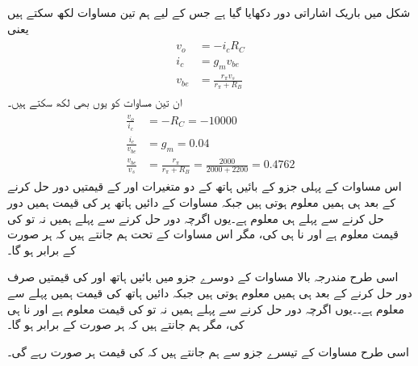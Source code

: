 شکل   میں باریک اشاراتی دور دکھایا گیا ہے جس کے لیے ہم تین مساوات لکھ سکتے ہیں یعنی
\begin{gather}
\begin{aligned}
v_o &=-i_c R_C\\
i_c &=g_m v_{be}\\
v_{be} &=\frac{r_{\pi} v_s}{r_{\pi}+R_B}
\end{aligned}
\end{gather}
ان تین مساوات کو یوں بھی لکھ سکتے ہیں۔
\begin{gather}  \label{مساوات_ٹرانزسٹر_شرح_کی_قیمتیں_الف}
\begin{aligned}
\frac{v_o}{i_c}&=-R_C = \num{-10000}\\
\frac{i_c}{v_{be}}&=g_m=\num{0.04}\\
\frac{v_{be}}{v_s}&=\frac{r_{\pi}}{r_{\pi}+R_B}=\frac{2000}{2000+2200}=\num{0.4762}
\end{aligned}
\end{gather}
اس مساوات کے پہلی جزو کے بائیں ہاتھ کے دو متغیرات  اور  کے قیمتیں دور حل کرنے کے بعد ہی ہمیں معلوم ہوتی ہیں جبکہ مساوات کے دائیں ہاتھ پر  کی قیمت  ہمیں دور حل کرنے سے پہلے ہی معلوم ہے۔یوں اگرچہ دور حل کرنے سے پہلے ہمیں نہ تو  کی قیمت معلوم ہے اور نا ہی  کی، مگر اس مساوات کے تحت ہم جانتے ہیں کہ  ہر صورت  کے برابر ہو گا۔


اسی طرح مندرجہ بالا مساوات کے دوسرے جزو میں بائیں ہاتھ  اور  کی قیمتیں صرف دور حل کرنے کے بعد ہی ہمیں معلوم ہوتی ہیں جبکہ دائیں ہاتھ  کی قیمت  ہمیں پہلے سے معلوم ہے۔۔یوں اگرچہ دور حل کرنے سے پہلے ہمیں نہ تو  کی قیمت معلوم ہے اور نا ہی  کی، مگر ہم جانتے ہیں کہ  ہر صورت  کے برابر ہو گا۔

اسی طرح مساوات کے تیسرے جزو سے ہم جانتے ہیں کہ  کی قیمت ہر صورت  رہے گی۔

